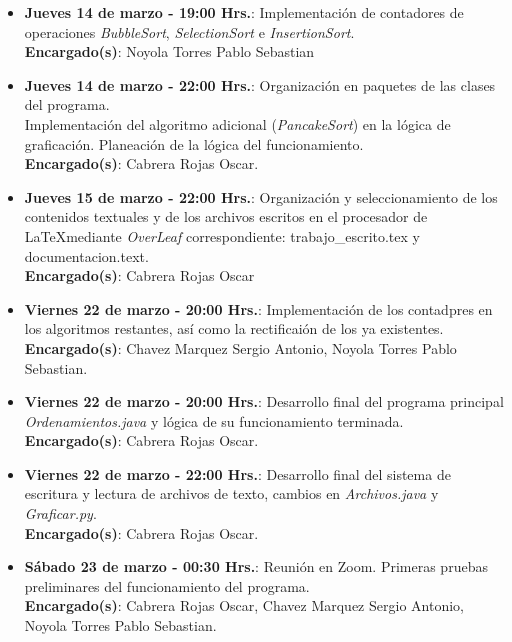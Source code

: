 \documentclass[a4paper,12pt]{article}
\begin{document}
\begin{itemize}
    \item \textbf{Jueves 14 de marzo - 19:00 Hrs.}: Implementación de contadores de operaciones \textit{BubbleSort}, \textit{SelectionSort} e \textit{InsertionSort}. \\
    \textbf{Encargado(s)}: Noyola Torres Pablo Sebastian

    \item \textbf{Jueves 14 de marzo - 22:00 Hrs.}: Organización en paquetes de las clases del programa. \\
    Implementación del algoritmo adicional (\textit{PancakeSort}) en la lógica de graficación. Planeación de la lógica del funcionamiento.\\
    \textbf{Encargado(s)}: Cabrera Rojas Oscar.

    \item \textbf{Jueves 15 de marzo - 22:00 Hrs.}: Organización y seleccionamiento de los contenidos textuales y de los archivos escritos en el procesador de \LaTeX mediante \textit{OverLeaf} correspondiente: trabajo\_escrito.tex y documentacion.text. \\
    \textbf{Encargado(s)}: Cabrera Rojas Oscar

    \item \textbf{Viernes 22 de marzo - 20:00 Hrs.}: Implementación de los contadpres en los algoritmos restantes, así como la rectificaión de los ya existentes. \\
    \textbf{Encargado(s)}: Chavez Marquez Sergio Antonio, Noyola Torres Pablo Sebastian.

    \item \textbf{Viernes 22 de marzo - 20:00 Hrs.}: Desarrollo final del programa principal \textit{Ordenamientos.java} y lógica de su funcionamiento terminada.\\
    \textbf{Encargado(s)}: Cabrera Rojas Oscar.

    \item \textbf{Viernes 22 de marzo - 22:00 Hrs.}: Desarrollo final del sistema de escritura y lectura de archivos de texto, cambios en \textit{Archivos.java} y \textit{Graficar.py}.\\
    \textbf{Encargado(s)}: Cabrera Rojas Oscar.

    \item \textbf{Sábado 23 de marzo - 00:30 Hrs.}: Reunión en Zoom. Primeras pruebas preliminares del funcionamiento del programa.\\
    \textbf{Encargado(s)}: Cabrera Rojas Oscar, Chavez Marquez Sergio Antonio, Noyola Torres Pablo Sebastian.


\end{itemize}
\end{document}
